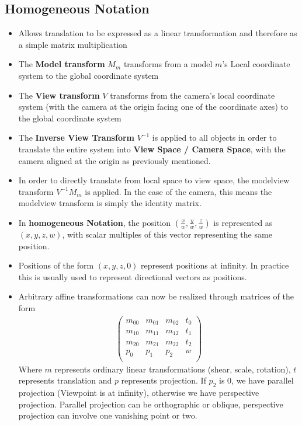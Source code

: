 \documentclass{scrartcl}
\begin{document}
\subsection*{Homogeneous Notation}
\begin{itemize}
    \item Allows translation to be expressed as a linear transformation and therefore as a simple matrix multiplication
    \item The \textbf{Model transform} $M_m$ transforms from a model $m$'s Local coordinate system to the global coordinate system
    \item The \textbf{View transform} $V$ transforms from the camera's local coordinate system (with the camera at the origin facing one of the coordinate axes) to the global coordinate system
    \item The \textbf{Inverse View Transform} $V^{-1}$ is applied to all objects in order to translate the entire system into \textbf{View Space / Camera Space}, with the camera aligned at the origin as previously mentioned.
    \item In order to directly translate from local space to view space, the modelview transform $V^{-1}M_m$ is applied. In the case of the camera, this means the modelview transform is simply the identity matrix.
    \item In \textbf{homogeneous Notation}, the position $(\frac{x}{w},\frac{y}{w},\frac{z}{w})$ is represented as $(x,y,z,w)$, with scalar multiples of this vector representing the same position.
    \item Positions of the form $(x,y,z,0)$ represent positions at infinity. In practice this is usually used to represent directional vectors as positions.
    \item Arbitrary affine transformations can now be realized through matrices of the form
    \begin{align*}
        \begin{pmatrix}
            m_{00} & m_{01} & m_{02} & t_0\\
            m_{10} & m_{11} & m_{12} & t_1\\
            m_{20} & m_{21} & m_{22} & t_2\\
            p_{0} & p_{1} & p_{2} & w\\
        \end{pmatrix}
    \end{align*}
    Where $m$ represents ordinary linear transformations (shear, scale, rotation), $t$ represents translation and $p$ represents projection. If $p_2$ is $0$, we have parallel projection (Viewpoint is at infinity), otherwise we have perspective projection. Parallel projection can be orthographic or oblique, perspective projection can involve one vanishing point or two.

\end{itemize}
\end{document}
